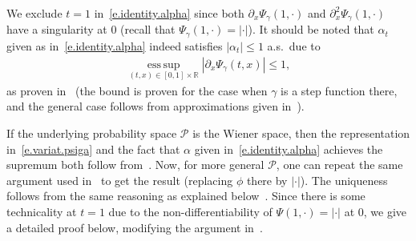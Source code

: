 \documentclass[11pt]{amsart}
\theoremstyle{remark}
\theoremstyle{definition}
\numberwithin{equation}{section}
\numberwithin{proposition}{section}
\numberwithin{figure}{section}
\numberwithin{table}{section}
\newcommand{\R}{\mathbb{R}}
\renewcommand{\leq}{\leqslant}
\newcommand{\1}{\mathbf{1}}
\newcommand{\msc}{\mathscr}
\newcommand{\bprog}{\mathbf{Prog}}
\begin{document}
We exclude $t=1$ in~\eqref{e.identity.alpha} since both $\partial_x\Psi_\gamma(1,\cdot)$ and $\partial^2_x\Psi_\gamma(1,\cdot)$ have a singularity at $0$ (recall that $\Psi_\gamma(1,\cdot)=|\cdot|$).
It should be noted that $\alpha_t$ given as in~\eqref{e.identity.alpha} indeed satisfies $|\alpha_t|\leq 1$ a.s.\ due to
\begin{align}\label{e.|dxPhi|<1}
    \operatorname*{ess\,sup}_{(t,x)\in[0,1]\times\R}|\partial_x\Psi_\gamma(t,x)|\leq 1,
\end{align}
as proven in~\cite[Lemma~11]{chen2018energy} (the bound is proven for the case when $\gamma$ is a step function there, and the general case follows from approximations given in~\cite[Proposition~2~(iii)]{chen2018energy}).




If the underlying probability space $\msc P$ is the Wiener space, then the representation in~\eqref{e.variat.psiga} and the fact that $\alpha$ given in~\eqref{e.identity.alpha} achieves the supremum both follow from~\cite[Theorem~5]{chen2018energy}. 
Now, for more general $\msc P$, one can repeat the same argument used in~\cite[Lemma~2.1]{mourrat2025uninverting} to get the result (replacing $\phi$ there by $|\cdot|$). The uniqueness follows from the same reasoning as explained below~\cite[(2.8)]{mourrat2025uninverting}. Since there is some technicality at $t=1$ due to the non-differentiability of $\Psi(1,\cdot)=|\cdot|$ at $0$, we give a detailed proof below, modifying the argument in~\cite[Lemma~2.1]{mourrat2025uninverting}.
\end{document}
